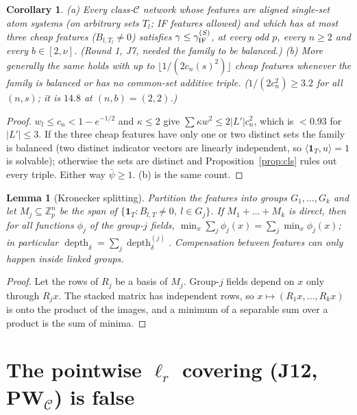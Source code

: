 \documentclass[11pt]{article}
\newtheorem{lemma}[theorem]{Lemma}
\newtheorem{corollary}[theorem]{Corollary}
\theoremstyle{remark}
\begin{document}
\begin{corollary}\label{cor:three}
(a) Every class-$\mathcal C$ network whose features are aligned single-set atom systems (on \emph{arbitrary} sets $T_l$; IF features allowed)
and which has at most three cheap features ($B_{l,T_l}\neq0$) satisfies $\gamma\le\gamma^{(S)}_{\rm IF}$, at every odd $p$, every $n\ge2$ and every
$b\in[2,\nu]$. (Round 1, J7, needed the family to be balanced.)
(b) More generally the same holds with up to $\lfloor 1/(2c_n(s)^2)\rfloor$ cheap features whenever the family is balanced or has no
common-set additive triple. ($1/(2c_n^2)\ge3.2$ for all $(n,s)$; it is $14.8$ at $(n,b)=(2,2)$.)
\end{corollary}
\begin{proof}
$w_l\le c_n<1-e^{-1/2}$ and $\kappa\le2$ give $\sum\kappa w^2\le2|L'|c_n^2$, which is $<0.93$ for $|L'|\le3$. If the three cheap features have only one or two
distinct sets the family is balanced (two distinct indicator vectors are linearly independent, so $\langle\mathbf 1_T,u\rangle=1$ is solvable); otherwise the sets
are distinct and Proposition~\ref{prop:cls} rules out every triple. Either way $\bar\psi\ge1$. (b) is the same count.
\end{proof}

\begin{lemma}[Kronecker splitting]\label{lem:split}
Partition the features into groups $G_1,\dots,G_k$ and let $M_j\subseteq\mathbb Z_p^n$ be the span of $\{\mathbf 1_T:B_{l,T}\neq0,\ l\in G_j\}$. If
$M_1+\dots+M_k$ is direct, then for all functions $\phi_j$ of the group-$j$ fields, $\min_x\sum_j\phi_j(x)=\sum_j\min_x\phi_j(x)$; in particular
$\operatorname{depth}_\delta=\sum_j\operatorname{depth}^{(j)}_\delta$. Compensation between features can only happen inside linked groups.
\end{lemma}
\begin{proof}
Let the rows of $R_j$ be a basis of $M_j$. Group-$j$ fields depend on $x$ only through $R_jx$. The stacked matrix has independent rows, so
$x\mapsto(R_1x,\dots,R_kx)$ is onto the product of the images, and a minimum of a separable sum over a product is the sum of minima.
\end{proof}

\section{The pointwise $\ell_r$ covering (J12, PW$_{\mathcal C}$) is false}
\end{document}
